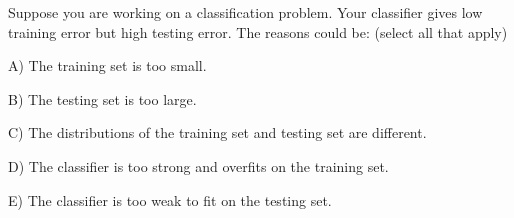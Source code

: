 Suppose you are working on a classification problem. Your classifier gives low training error but high testing error. The reasons could be: (select all that apply)


A) The training set is too small.


B) The testing set is too large.


C) The distributions of the training set and testing set are different.


D) The classifier is too strong and overfits on the training set.


E) The classifier is too weak to fit on the testing set.
